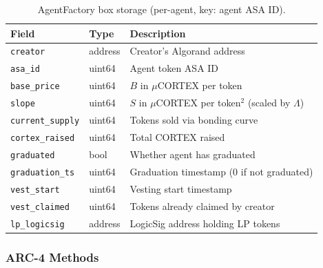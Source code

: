\begin{table}[H]
\centering
\caption{AgentFactory box storage (per-agent, key: agent ASA ID).}
\label{tab:factory-box}
\begin{tabular}{@{}llp{6cm}@{}}
\toprule
\textbf{Field} & \textbf{Type} & \textbf{Description} \\
\midrule
\texttt{creator} & address & Creator's Algorand address \\
\texttt{asa\_id} & uint64 & Agent token ASA ID \\
\texttt{base\_price} & uint64 & $B$ in $\mu$CORTEX per token \\
\texttt{slope} & uint64 & $S$ in $\mu$CORTEX per token$^2$ (scaled by $\Lambda$) \\
\texttt{current\_supply} & uint64 & Tokens sold via bonding curve \\
\texttt{cortex\_raised} & uint64 & Total CORTEX raised \\
\texttt{graduated} & bool & Whether agent has graduated \\
\texttt{graduation\_ts} & uint64 & Graduation timestamp (0 if not graduated) \\
\texttt{vest\_start} & uint64 & Vesting start timestamp \\
\texttt{vest\_claimed} & uint64 & Tokens already claimed by creator \\
\texttt{lp\_logicsig} & address & LogicSig address holding LP tokens \\
\bottomrule
\end{tabular}
\end{table}

\subsubsection{ARC-4 Methods}

